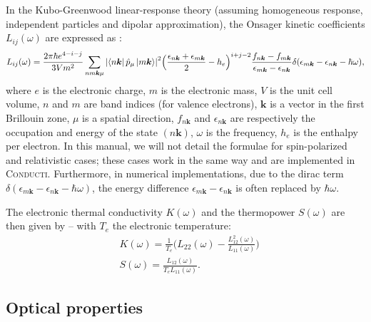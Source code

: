 \documentclass[a4,12pts]{extarticle}
\begin{document}
In the Kubo-Greenwood \cite{Kubo1957,Greenwood1958} linear-response theory (assuming homogeneous response, independent particles and dipolar approximation), the Onsager kinetic coefficients $L_{ij}(\omega)$ are expressed as \cite{Holst2011}:
\begin{align}
L_{ij}(\omega)=\frac{2\pi\hbar e^{4-i-j}}{3Vm^2}\sum_{nm\boldsymbol{k}\mu}\abs{\bra{n\boldsymbol{k}}\hat{p}_{\mu}\ket{m\boldsymbol{k}}}^{2}
\Big(\frac{\epsilon_{n\boldsymbol{k}}+\epsilon_{m\boldsymbol{k}}}{2}-h_e\Big)^{i+j-2}\frac{f_{n\boldsymbol{k}}-f_{m\boldsymbol{k}}}{\epsilon_{m\boldsymbol{k}}-\epsilon_{n\boldsymbol{k}}}\delta(\epsilon_{m\boldsymbol{k}}-\epsilon_{n\boldsymbol{k}}-\hbar\omega), \label{Lij}
\end{align}
where $e$ is the electronic charge, $m$ is the electronic mass, $V$ is the unit cell volume, $n$ and $m$ are band indices (for valence electrons), $\boldsymbol{k}$ is a vector in the first Brillouin zone, $\mu$ is a spatial direction, $f_{n\boldsymbol{k}}$ and $\epsilon_{n\boldsymbol{k}}$ are respectively the occupation and energy of the state $(n\boldsymbol{k})$, $\omega$ is the frequency, $h_e$ is the enthalpy per electron. In this manual, we will not detail the formulae for spin-polarized and relativistic cases; these cases work in the same way and are implemented in \textsc{Conducti}. Furthermore, in numerical implementations, due to the dirac term $\delta(\epsilon_{m\boldsymbol{k}}-\epsilon_{n\boldsymbol{k}}-\hbar\omega)$, the energy difference $\epsilon_{m\boldsymbol{k}}-\epsilon_{n\boldsymbol{k}}$ is often replaced by $\hbar\omega$.

\newpage

The electronic thermal conductivity $K(\omega)$ and the thermopower $S(\omega)$ are then given by -- with $T_e$ the electronic temperature:
\begin{align}
&K(\omega)=\frac{1}{T_e}\Big(L_{22}(\omega)-\frac{L_{12}^2(\omega)}{L_{11}(\omega)}\Big) \label{Kth}\\
&S(\omega)=\frac{L_{12}(\omega)}{T_eL_{11}(\omega)}. \label{Sth}
\end{align}

\subsection{Optical properties} \label{Valence}
\end{document}
